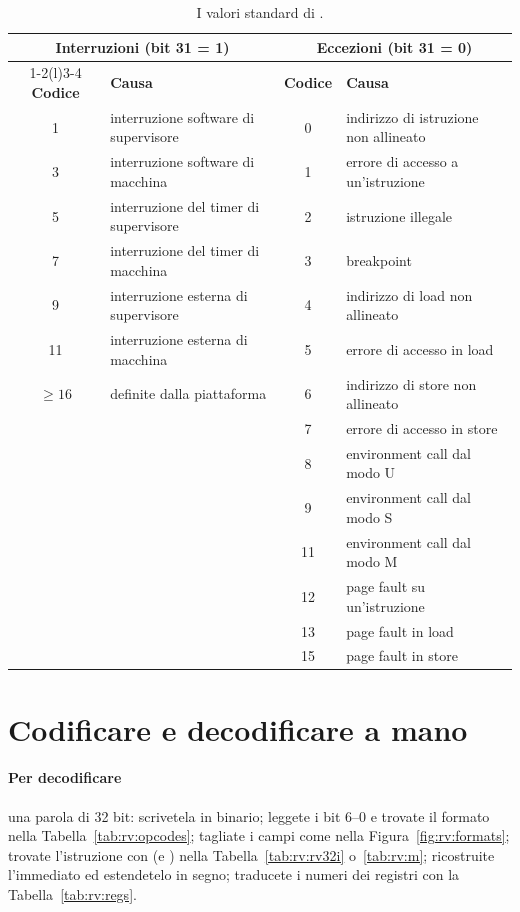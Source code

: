 \begin{table}[htb]
\centering\small
\caption{I valori standard di .}\label{tab:rv:mcause}
\begin{tabular}{@{}clcl@{}}
\toprule
\multicolumn{2}{c}{\textbf{Interruzioni} (bit 31 = 1)} & \multicolumn{2}{c}{\textbf{Eccezioni} (bit 31 = 0)}\\
\cmidrule(r){1-2}\cmidrule(l){3-4}
\textbf{Codice} & \textbf{Causa} & \textbf{Codice} & \textbf{Causa}\\
\midrule
1 & interruzione software di supervisore & 0 & indirizzo di istruzione non allineato\\
3 & interruzione software di macchina & 1 & errore di accesso a un'istruzione\\
5 & interruzione del timer di supervisore & 2 & istruzione illegale\\
7 & interruzione del timer di macchina & 3 & breakpoint\\
9 & interruzione esterna di supervisore & 4 & indirizzo di load non allineato\\
11 & interruzione esterna di macchina & 5 & errore di accesso in load\\
$\ge 16$ & definite dalla piattaforma & 6 & indirizzo di store non allineato\\
 & & 7 & errore di accesso in store\\
 & & 8 & environment call dal modo U\\
 & & 9 & environment call dal modo S\\
 & & 11 & environment call dal modo M\\
 & & 12 & page fault su un'istruzione\\
 & & 13 & page fault in load\\
 & & 15 & page fault in store\\
\bottomrule
\end{tabular}
\end{table}

\section{Codificare e decodificare a mano}

\paragraph{Per decodificare} una parola di 32 bit: scrivetela in binario;
leggete i bit 6--0 e trovate il formato nella Tabella~\ref{tab:rv:opcodes};
tagliate i campi come nella Figura~\ref{fig:rv:formats}; trovate l'istruzione
con  (e ) nella Tabella~\ref{tab:rv:rv32i}
o~\ref{tab:rv:m}; ricostruite l'immediato ed estendetelo in segno; traducete i
numeri dei registri con la Tabella~\ref{tab:rv:regs}.

